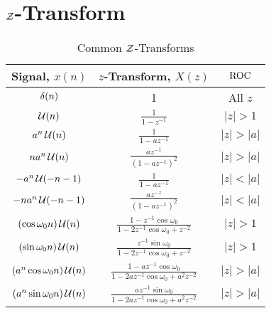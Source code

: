 \section{\texorpdfstring{$\operatorname{\mathcal{Z}}$-Transform}{Z-Transform}}\label{sec:Z-Transform}
\begin{table}[h!]
  \centering
  \renewcommand{\arraystretch}{1.4}
  \begin{tabular}{ccc}
    \toprule
    Signal, $x(n)$ & $z$-Transform, $X(z)$ & $\operatorname{\mathrm{ROC}}$ \\
    \midrule
    $\operatorname{\delta}(n)$ & 1 & All $z$ \\
    $\operatorname{\mathcal{U}}(n)$ & $\frac{1}{1-z^{-1}}$ & $\lvert z \rvert > 1$ \\
    $a^{n}\operatorname{\mathcal{U}}(n)$ & $\frac{1}{1-az^{-1}}$ & $\lvert z \rvert > \lvert a \rvert$ \\
    $na^{n}\operatorname{\mathcal{U}}(n)$ & $\frac{az^{-1}}{{\left( 1-az^{-1} \right)}^{2}}$ & $\lvert z \rvert > \lvert a \rvert$ \\
    $-a^{n}\operatorname{\mathcal{U}}(-n-1)$ & $\frac{1}{1-az^{-1}}$ & $\lvert z \rvert < \lvert a \rvert$ \\
    $-na^{n}\operatorname{\mathcal{U}}(-n-1)$ & $\frac{az^{-z}}{{\left( 1-az^{-1} \right)}^{2}}$ & $\lvert z \rvert < \lvert a \rvert$ \\
    $\left( \cos \omega_{0}n \right) \operatorname{\mathcal{U}}(n)$ & $\frac{1-z^{-1}\cos \omega_{0}}{1-2z^{-1}\cos \omega_{0} + z^{-2}}$ & $\lvert z \rvert > 1$ \\
    $\left( \sin \omega_{0}n \right) \operatorname{\mathcal{U}}(n)$ & $\frac{z^{-1}\sin \omega_{0}}{1-2z^{-1}\cos \omega_{0} + z^{-2}}$ & $\lvert z \rvert > 1$ \\
    $\left( a^{n} \cos \omega_{0}n \right) \operatorname{\mathcal{U}}(n)$ & $\frac{1-az^{-1}\cos \omega_{0}}{1-2az^{-1} \cos \omega_{0} + a^{2}z^{-2}}$ & $\lvert z \rvert > \lvert a \rvert$ \\
        $\left( a^{n} \sin \omega_{0}n \right) \operatorname{\mathcal{U}}(n)$ & $\frac{az^{-1}\sin \omega_{0}}{1-2az^{-1} \cos \omega_{0} + a^{2}z^{-2}}$ & $\lvert z \rvert > \lvert a \rvert$ \\
    \bottomrule
  \end{tabular}
  \caption{Common $\operatorname{\mathcal{Z}}$-Transforms}
  \label{tab:Common Z-Transforms}
\end{table}


